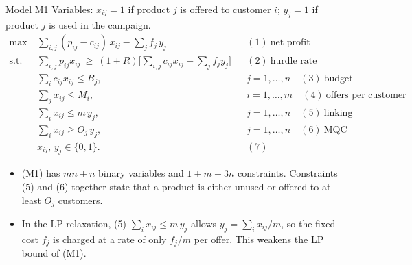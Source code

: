 \documentclass[10pt,aspectratio=169]{beamer}
\begin{document}
\begin{frame}{Model M1}
  \vspace{-4pt}
  \small
  Variables: $x_{ij}=1$ if product $j$ is offered to customer $i$; $y_j=1$ if product $j$ is used in the campaign.
  {\setlength{\abovedisplayskip}{2pt}\setlength{\belowdisplayskip}{2pt}\setlength{\jot}{1pt}
  \begin{align*}
    \max\ & \sum\nolimits_{i,j}(p_{ij}-c_{ij})\,x_{ij}-\sum\nolimits_{j}f_j\,y_j && (1)\ \text{net profit}\\
    \text{s.t.}\ & \sum\nolimits_{i,j}p_{ij}x_{ij}\ \ge\ (1+R)\Big[\sum\nolimits_{i,j}c_{ij}x_{ij}+\sum\nolimits_{j}f_j y_j\Big] && (2)\ \text{hurdle rate}\\
    & \sum\nolimits_{i}c_{ij}x_{ij}\le B_j, && j=1,\dots,n \quad (3)\ \text{budget}\\
    & \sum\nolimits_{j}x_{ij}\le M_i, && i=1,\dots,m \quad (4)\ \text{offers per customer}\\
    & \sum\nolimits_{i}x_{ij}\le m\,y_j, && j=1,\dots,n \quad (5)\ \text{linking}\\
    & \sum\nolimits_{i}x_{ij}\ge O_j\,y_j, && j=1,\dots,n \quad (6)\ \text{MQC}\\
    & x_{ij},\,y_j\in\{0,1\}. && (7)
  \end{align*}}
  \vspace{-4pt}
  \footnotesize
  \begin{itemize}
    \item (M1) has $mn+n$ binary variables and $1+m+3n$ constraints. Constraints (5) and (6) together state that
          a product is either unused or offered to at least $O_j$ customers.
    \item In the LP relaxation, (5) $\sum_i x_{ij}\le m\,y_j$ allows $y_j=\sum_i x_{ij}/m$, so the fixed cost $f_j$ is charged
          at a rate of only $f_j/m$ per offer. This weakens the LP bound of (M1).
  \end{itemize}
\end{frame}
\end{document}
